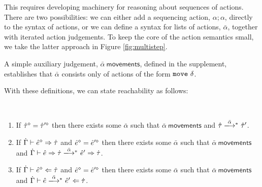 This requires developing machinery for reasoning about sequences of
actions. There are two possibilities: we can either add a sequencing
action, $\alpha; \alpha$, directly to the syntax of actions, or we can
define a syntax for lists of actions, $\bar{\alpha}$, together with
iterated action judgements. To keep the core of the action semantics small,
we take the latter approach in Figure \ref{fig:multistep}.

A simple auxiliary judgement, $\bar\alpha~\mathsf{movements}$, defined in
the supplement, establishes that $\bar\alpha$ consists only of actions of
the form $\mathtt{move}~\delta$.

With these definitions, we can state reachability as follows:

\begin{theorem}[Reachability]\label{thrm:reachability} ~
  \begin{enumerate}[itemsep=0px,partopsep=0px,topsep=0px]
  \item If $\hat{\tau}^{\diamond}=\hat{\tau}'^{\diamond}$ then there exists some
    $\bar\alpha$ such that $\bar{\alpha}~\mathsf{movements}$ and
    $\performTypI{\ztau}{\bar\alpha}{\ztau'}$.

  \item If $\dot{\Gamma} \vdash \hat{e}^{\diamond} \Rightarrow \dot{\tau}$ and
    $\hat{e}^{\diamond}=\hat{e}'^{\diamond}$ then there exists some
    $\bar{\alpha}$ such that $\bar{\alpha}~\mathsf{movements}$ and
    $\performSynI{\hGamma}{\zexp}{\htau}{\bar\alpha}{\zexp'}{\htau}$.

  \item If $\dot{\Gamma} \vdash \hat{e}^{\diamond} \Leftarrow \dot{\tau}$ and
    $\hat{e}^{\diamond}=\hat{e}'^{\diamond}$ then there exists some
    $\bar{\alpha}$ such that $\bar{\alpha}~\mathsf{movements}$ and
    $\performAnaI{\hGamma}{\zexp}{\htau}{\bar{\alpha}}{\zexp'}$.
  \end{enumerate}
\end{theorem}


